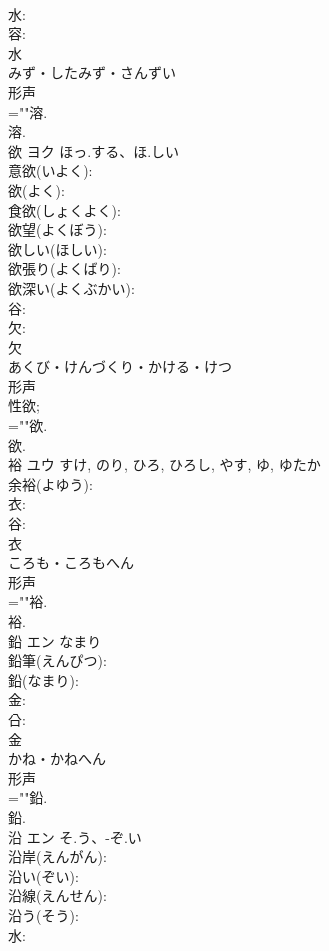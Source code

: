 \documentclass[8pt]{extreport}
\begin{document}
\begin{CJK}{UTF8}{min}
\\	水: 
\\	容: 
\\	水	
\\	みず・したみず・さんずい	
\\	形声 
\\	=""溶.
\\	溶.
\\	欲	ヨク	ほっ.する、ほ.しい		
\\	意欲(いよく): 
\\	欲(よく): 
\\	食欲(しょくよく): 
\\	欲望(よくぼう): 
\\	欲しい(ほしい): 
\\	欲張り(よくばり): 
\\	欲深い(よくぶかい): 
\\	谷: 
\\	欠: 
\\	欠	
\\	あくび・けんづくり・かける・けつ	
\\	形声 
\\	性欲; 
\\	=""欲.
\\	欲.
\\	裕	ユウ		すけ, のり, ひろ, ひろし, やす, ゆ, ゆたか	
\\	余裕(よゆう): 
\\	衣: 
\\	谷: 
\\	衣	
\\	ころも・ころもへん	
\\	形声 
\\	=""裕.
\\	裕.
\\	鉛	エン	なまり		
\\	鉛筆(えんぴつ): 
\\	鉛(なまり): 
\\	金: 
\\	㕣: 
\\	金	
\\	かね・かねへん	
\\	形声 
\\	=""鉛.
\\	鉛.
\\	沿	エン	そ.う、-ぞ.い		
\\	沿岸(えんがん): 
\\	沿い(ぞい): 
\\	沿線(えんせん): 
\\	沿う(そう): 
\\	水: 

\end{CJK}
\end{document}
